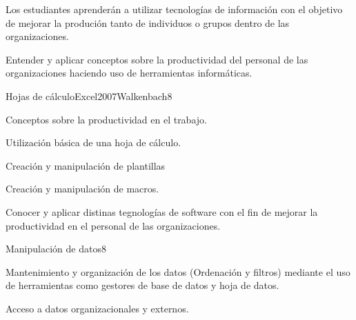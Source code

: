\begin{syllabus}


\begin{justification}
Los estudiantes aprenderán a utilizar tecnologías de información con el objetivo de mejorar
la produción tanto de individuos o grupos dentro de las organizaciones.
\end{justification}

\begin{goals}
\item Entender y aplicar conceptos  sobre la productividad del personal de las organizaciones haciendo uso de herramientas informáticas.
\end{goals}

\begin{outcomes}
\end{outcomes}

\begin{unit}{Hojas de cálculo}{Excel2007Walkenbach}{8}
   \begin{topics}
      \item Conceptos sobre la productividad en el trabajo.
      \item Utilización básica de una hoja de cálculo.
      \item Creación y manipulación de plantillas
      \item Creación y manipulación de macros.
   \end{topics}

   \begin{learningoutcomes}
      \item Conocer y aplicar distinas  tegnologías  de software con el fin de mejorar la productividad en el personal de las organizaciones.
   \end{learningoutcomes}
\end{unit}

\begin{unit}{Manipulación de datos}{}{8}
   \begin{topics}
      \item Mantenimiento y organización de los datos (Ordenación y filtros) mediante el uso de herramientas como gestores de base de datos y hoja de datos.
      \item Acceso a datos organizacionales y externos.
   \end{topics}


\end{unit}
\end{syllabus}
